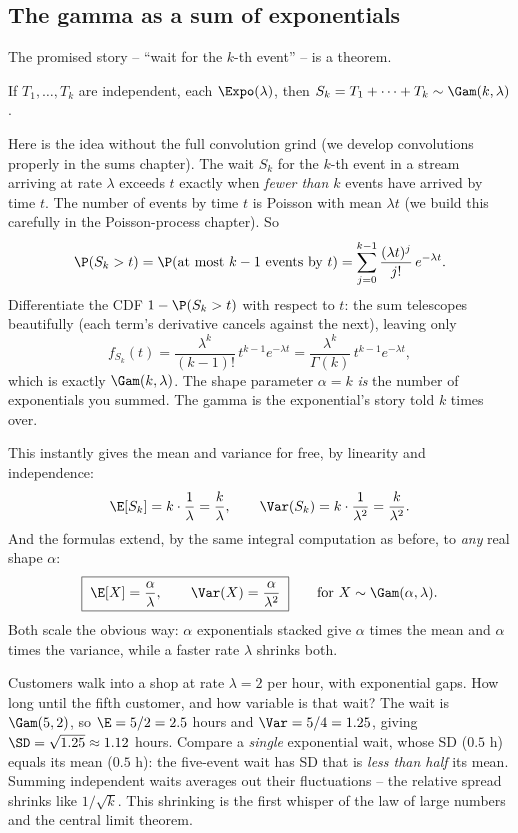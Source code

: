 \subsection{The gamma as a sum of exponentials}

The promised story -- ``wait for the $k$-th event'' -- is a theorem.

\begin{theorem}
\label{ch11:thm-sum-expo}
If $T_1,\dots,T_k$ are independent, each $\Expo(\lambda)$, then
$S_k = T_1 + \cdots + T_k \sim \Gam(k,\lambda)$.
\end{theorem}

\begin{whybox}
Here is the idea without the full convolution grind (we develop convolutions
properly in the sums chapter). The wait $S_k$ for the $k$-th event in a stream
arriving at rate $\lambda$ exceeds $t$ exactly when \emph{fewer than $k$} events
have arrived by time $t$. The number of events by time $t$ is Poisson with mean
$\lambda t$ (we build this carefully in the Poisson-process chapter). So
\[
  \P(S_k > t) = \P(\text{at most } k-1 \text{ events by } t)
              = \sum_{j=0}^{k-1} \frac{(\lambda t)^j}{j!}\,e^{-\lambda t}.
\]
Differentiate the CDF $1 - \P(S_k>t)$ with respect to $t$: the sum telescopes
beautifully (each term's derivative cancels against the next), leaving only
\[
  f_{S_k}(t) = \frac{\lambda^{k}}{(k-1)!}\,t^{k-1} e^{-\lambda t}
             = \frac{\lambda^{k}}{\Gamma(k)}\,t^{k-1} e^{-\lambda t},
\]
which is exactly $\Gam(k,\lambda)$. The shape parameter $\alpha = k$ \emph{is}
the number of exponentials you summed. The gamma is the exponential's story told
$k$ times over.
\end{whybox}

This instantly gives the mean and variance for free, by linearity and
independence:
\[
  \E[S_k] = k\cdot\frac{1}{\lambda} = \frac{k}{\lambda},
  \qquad
  \Var(S_k) = k\cdot\frac{1}{\lambda^2} = \frac{k}{\lambda^2}.
\]
And the formulas extend, by the same integral computation as before, to
\emph{any} real shape $\alpha$:
\[
  \boxed{\;\E[X] = \frac{\alpha}{\lambda}, \qquad
         \Var(X) = \frac{\alpha}{\lambda^2}\;}
  \qquad \text{for } X\sim\Gam(\alpha,\lambda).
\]
Both scale the obvious way: $\alpha$ exponentials stacked give $\alpha$ times the
mean and $\alpha$ times the variance, while a faster rate $\lambda$ shrinks both.

\begin{example}
\label{ch11:ex-fifth}
Customers walk into a shop at rate $\lambda = 2$ per hour, with exponential gaps.
How long until the fifth customer, and how variable is that wait? The wait is
$\Gam(5,2)$, so $\E = 5/2 = 2.5$ hours and $\Var = 5/4 = 1.25$, giving
$\SD = \sqrt{1.25}\approx 1.12$ hours. Compare a \emph{single} exponential wait,
whose SD ($0.5$ h) equals its mean ($0.5$ h): the five-event wait has SD that is
\emph{less than half} its mean. Summing independent waits averages out their
fluctuations -- the relative spread shrinks like $1/\sqrt{k}$. This shrinking is
the first whisper of the law of large numbers and the central limit theorem.
\end{example}

